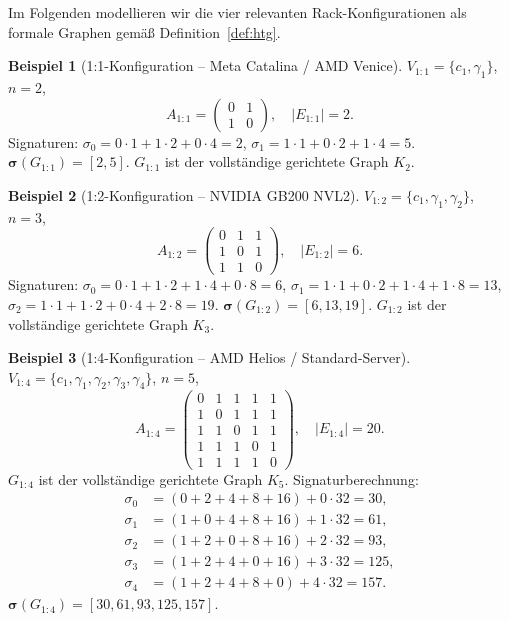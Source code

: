 ﻿\documentclass[a4paper,12pt]{article}
\theoremstyle{definition}
\newtheorem{beispiel}{Beispiel}
\begin{document}
Im Folgenden modellieren wir die vier relevanten Rack-Konfigurationen als formale Graphen gem\"{a}{\ss} Definition~\ref{def:htg}.

\begin{beispiel}[1:1-Konfiguration -- Meta Catalina / AMD Venice]
  \label{ex:11}
  $V_{1:1} = \{c_1, \gamma_1\}$, $n = 2$,
  \[
    A_{1:1} = \begin{pmatrix} 0 & 1 \\ 1 & 0 \end{pmatrix}, \quad
    |E_{1:1}| = 2.
  \]
  Signaturen: $\sigma_0 = 0 \cdot 1 + 1 \cdot 2 + 0 \cdot 4 = 2$, $\sigma_1 = 1 \cdot 1 + 0 \cdot 2 + 1 \cdot 4 = 5$.
  $\boldsymbol{\sigma}(G_{1:1}) = [2, 5]$.
  $G_{1:1}$ ist der vollst\"{a}ndige gerichtete Graph $K_2$.
\end{beispiel}

\begin{beispiel}[1:2-Konfiguration -- NVIDIA GB200 NVL2]
  \label{ex:12}
  $V_{1:2} = \{c_1, \gamma_1, \gamma_2\}$, $n = 3$,
  \[
    A_{1:2} = \begin{pmatrix} 0 & 1 & 1 \\ 1 & 0 & 1 \\ 1 & 1 & 0 \end{pmatrix}, \quad
    |E_{1:2}| = 6.
  \]
  Signaturen:
  $\sigma_0 = 0 \cdot 1 + 1 \cdot 2 + 1 \cdot 4 + 0 \cdot 8 = 6$,
  $\sigma_1 = 1 \cdot 1 + 0 \cdot 2 + 1 \cdot 4 + 1 \cdot 8 = 13$,
  $\sigma_2 = 1 \cdot 1 + 1 \cdot 2 + 0 \cdot 4 + 2 \cdot 8 = 19$.
  $\boldsymbol{\sigma}(G_{1:2}) = [6, 13, 19]$.
  $G_{1:2}$ ist der vollst\"{a}ndige gerichtete Graph $K_3$.
\end{beispiel}

\begin{beispiel}[1:4-Konfiguration -- AMD Helios / Standard-Server]
  \label{ex:14}
  $V_{1:4} = \{c_1, \gamma_1, \gamma_2, \gamma_3, \gamma_4\}$, $n = 5$,
  \[
    A_{1:4} = \begin{pmatrix}
      0 & 1 & 1 & 1 & 1 \\
      1 & 0 & 1 & 1 & 1 \\
      1 & 1 & 0 & 1 & 1 \\
      1 & 1 & 1 & 0 & 1 \\
      1 & 1 & 1 & 1 & 0
    \end{pmatrix}, \quad |E_{1:4}| = 20.
  \]
  $G_{1:4}$ ist der vollst\"{a}ndige gerichtete Graph $K_5$.
  Signaturberechnung:
  \begin{align*}
    \sigma_0 &= (0 + 2 + 4 + 8 + 16) + 0 \cdot 32 = 30, \\
    \sigma_1 &= (1 + 0 + 4 + 8 + 16) + 1 \cdot 32 = 61, \\
    \sigma_2 &= (1 + 2 + 0 + 8 + 16) + 2 \cdot 32 = 93, \\
    \sigma_3 &= (1 + 2 + 4 + 0 + 16) + 3 \cdot 32 = 125, \\
    \sigma_4 &= (1 + 2 + 4 + 8 + 0) + 4 \cdot 32 = 157.
  \end{align*}
  $\boldsymbol{\sigma}(G_{1:4}) = [30, 61, 93, 125, 157]$.
\end{beispiel}
\end{document}
